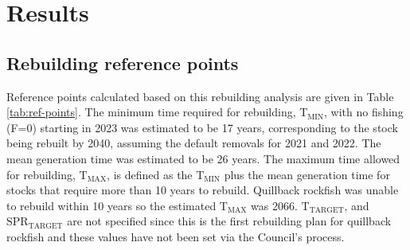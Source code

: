 \documentclass[11pt,
  english,
  letterpaper,
]{article}
\begin{document}
\leavevmode\tagmcend\tagstructend\par


\hypertarget{results}{%
\section{Results}\label{results}}

\leavevmode\tagmcend\tagstructend


\hypertarget{rebuilding-reference-points}{%
\subsection{Rebuilding reference points}\label{rebuilding-reference-points}}

\leavevmode\tagmcend\tagstructend


Reference points calculated based on this rebuilding analysis are given in Table \ref{tab:ref-points}. The minimum time required for rebuilding, {\(\text{T}_\text{MIN}\)\leavevmode\tagmcend\tagstructend}, with no fishing (F=0) starting in 2023 was estimated to be 17 years, corresponding to the stock being rebuilt by 2040, assuming the default removals for 2021 and 2022. The mean generation time was estimated to be 26 years. The maximum time allowed for rebuilding, {\(\text{T}_\text{MAX}\)\leavevmode\tagmcend\tagstructend}, is defined as the {\(\text{T}_\text{MIN}\)\leavevmode\tagmcend\tagstructend} plus the mean generation time for stocks that require more than 10 years to rebuild. Quillback rockfish was unable to rebuild within 10 years so the estimated {\(\text{T}_\text{MAX}\)\leavevmode\tagmcend\tagstructend} was 2066. {\(\text{T}_\text{TARGET}\)\leavevmode\tagmcend\tagstructend}, and {\(\text{SPR}_\text{TARGET}\)\leavevmode\tagmcend\tagstructend} are not specified since this is the first rebuilding plan for quillback rockfish and these values have not been set via the Council's process.

\leavevmode\tagmcend\tagstructend\par
\end{document}
